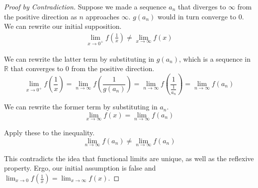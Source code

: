 \documentclass[12pt]{report}
\begin{document}
\begin{proof}[Proof by Contradiction]
        Suppose we made a sequence $a_n$ that diverges to $\infty$ from the positive direction as $n$ approaches $\infty$.
        $g(a_n)$ would in turn converge to $0$.
        We can rewrite our initial supposition.
        \begin{gather}
            \lim_{x \to 0^+} f\left( \frac{1}{x} \right) \neq \lim_{x \to \infty} f(x)
        \end{gather}

        We can rewrite the latter term by substituting in $g(a_n)$, which is a sequence in $\mathbb{R}$ that converges to $0$ from the positive direction.
        \begin{equation}
            \lim_{x \to 0^+} f\left( \frac{1}{x} \right) = \lim_{n \to \infty} f \left( \frac{1}{g(a_n)} \right)
                =   \lim_{n \to \infty} f \left( \frac{1}{\frac{1}{a_n}} \right)
                =   \lim_{n \to \infty} f \left( a_n \right)
        \end{equation}

        We can rewrite the former term by substituting in $a_n$.
        \begin{equation}
            \lim_{x \to \infty} f(x) = \lim_{n \to \infty} f \left( a_n \right)
        \end{equation}

        Apply these to the inequality.
        \begin{equation}
            \lim_{n \to \infty} f(a_n) \neq \lim_{n \to \infty} f(a_n)
        \end{equation}

        This contradicts the idea that functional limits are unique, as well as the reflexive property.
        Ergo, our initial assumption is false and $\lim_{x \to 0} f\left( \frac{1}{x} \right) = \lim_{x \to \infty} f(x)$. 
    \end{proof}
\end{document}
